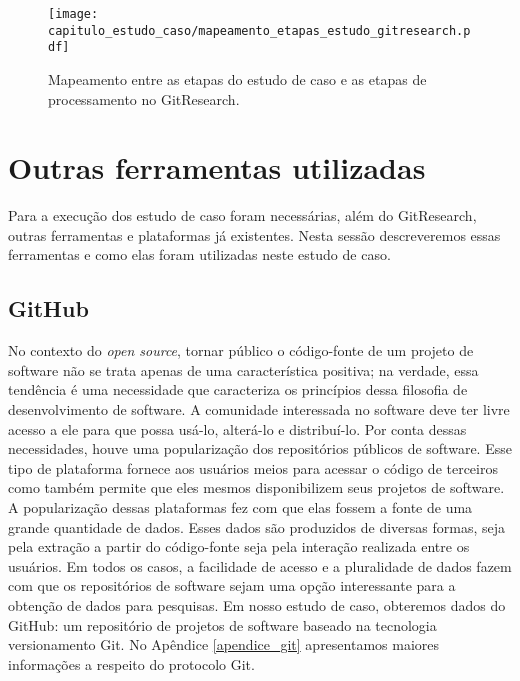   \begin{figure}[H]
  \centering
  \texttt{[image: capitulo\_estudo\_caso/mapeamento\_etapas\_estudo\_gitresearch.pdf]} 
  \caption{Mapeamento entre as etapas do estudo de caso e as etapas de processamento no GitResearch. }
  \label{fig:cap_metodo_mapeamento_estudo_gitresearch} 
\end{figure}
 





\section{Outras ferramentas utilizadas}

Para a execução dos estudo de caso foram necessárias, além do GitResearch, outras ferramentas e plataformas já existentes. Nesta sessão descreveremos essas ferramentas e como elas foram utilizadas neste estudo de caso.


\subsection{GitHub}
\label{cap_estudo_github}

No contexto do \textit{open source}, tornar público o código-fonte de um projeto de software não se trata apenas de uma característica positiva; na verdade, essa tendência é uma necessidade que caracteriza os princípios dessa filosofia de desenvolvimento de software. A comunidade interessada no software deve ter livre acesso a ele para que possa usá-lo, alterá-lo e distribuí-lo. Por conta dessas necessidades, houve uma popularização dos repositórios públicos de software. Esse tipo de plataforma fornece aos usuários meios para acessar o código  de terceiros como também permite que eles mesmos disponibilizem seus projetos de software. A popularização dessas plataformas fez com que elas fossem a fonte de uma grande quantidade de dados. Esses dados são produzidos de diversas formas, seja pela extração a partir do código-fonte seja pela interação realizada entre os usuários.  Em todos os casos, a facilidade de acesso e a pluralidade de dados fazem com que os repositórios de software sejam uma opção interessante para a obtenção de dados para pesquisas. Em nosso estudo de caso, obteremos dados do GitHub: um repositório de projetos  de software baseado na tecnologia versionamento Git\cite{loeliger2012version}. No Apêndice \ref{apendice_git} apresentamos maiores informações a respeito do protocolo Git. 


